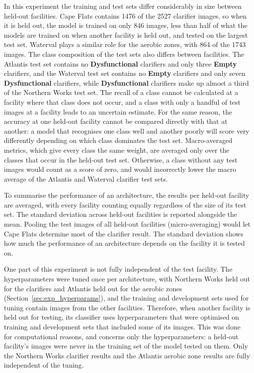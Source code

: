 In this experiment the training and test sets differ considerably in size between held-out facilities. Cape Flats contains 1476 of the 2527 clarifier images, so when it is held out, the model is trained on only 846 images, less than half of what the models are trained on when another facility is held out, and tested on the largest test set. Waterval plays a similar role for the aerobic zones, with 864 of the 1743 images. The class composition of the test sets also differs between facilities. The Atlantis test set contains no \textbf{Dysfunctional} clarifiers and only three \textbf{Empty} clarifiers, and the Waterval test set contains no \textbf{Empty} clarifiers and only seven \textbf{Dysfunctional} clarifiers, while \textbf{Dysfunctional} clarifiers make up almost a third of the Northern Works test set. The recall of a class cannot be calculated at a facility where that class does not occur, and a class with only a handful of test images at a facility leads to an uncertain estimate. For the same reason, the accuracy at one held-out facility cannot be compared directly with that at another: a model that recognises one class well and another poorly will score very differently depending on which class dominates the test set. Macro-averaged metrics, which give every class the same weight, are averaged only over the classes that occur in the held-out test set. Otherwise, a class without any test images would count as a score of zero, and would incorrectly lower the macro average of the Atlantis and Waterval clarifier test sets.

To summarise the performance of an architecture, the results per held-out facility are averaged, with every facility counting equally regardless of the size of its test set. The standard deviation across held-out facilities is reported alongside the mean. Pooling the test images of all held-out facilities (micro-averaging) would let Cape Flats determine most of the clarifier result. The standard deviation shows how much the performance of an architecture depends on the facility it is tested on.

One part of this experiment is not fully independent of the test facility. The hyperparameters were tuned once per architecture, with Northern Works held out for the clarifiers and Atlantis held out for the aerobic zones (Section~\ref{sec:exp_hyperparams}), and the training and development sets used for tuning contain images from the other facilities. Therefore, when another facility is held out for testing, its classifier uses hyperparameters that were optimised on training and development sets that included some of its images. This was done for computational reasons, and concerns only the hyperparameters: a held-out facility's images were never in the training set of the model tested on them. Only the Northern Works clarifier results and the Atlantis aerobic zone results are fully independent of the tuning.


